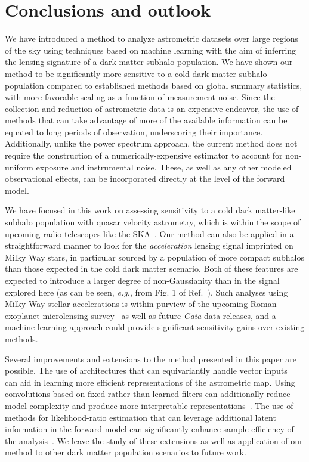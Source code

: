 \documentclass[preprint]{article}
\begin{document}
\section{Conclusions and outlook}
\label{sec:conclusions}

We have introduced a method to analyze astrometric datasets over large regions of the sky using techniques based on machine learning with the aim of inferring the lensing signature of a dark matter subhalo population. We have shown our method to be significantly more sensitive to a cold dark matter subhalo population compared to established methods based on global summary statistics, with more favorable scaling as a function of measurement noise. Since the collection and reduction of astrometric data is an expensive endeavor, the use of methods that can take advantage of more of the available information can be equated to long periods of observation, underscoring their importance. Additionally, unlike the power spectrum approach, the current method does not require the construction of a numerically-expensive estimator to account for non-uniform exposure and instrumental noise. These, as well as any other modeled observational effects, can be incorporated directly at the level of the forward model. 

We have focused in this work on assessing sensitivity to a cold dark matter-like subhalo population with quasar velocity astrometry, which is within the scope of upcoming radio telescopes like the SKA~\cite{Fomalont:2004hr,Jarvis:2015tqa}. Our method can also be applied in a straightforward manner to look for the \emph{acceleration} lensing signal imprinted on Milky Way stars, in particular sourced by a population of more compact subhalos than those expected in the cold dark matter scenario. Both of these features are expected to introduce a larger degree of non-Gaussianity than in the signal explored here (as can be seen, \emph{e.g.}, from Fig. 1 of Ref.~\cite{Mishra-Sharma:2020ynk}). Such analyses using Milky Way stellar accelerations is within purview of the upcoming Roman exoplanet microlensing survey~\cite{Pardo:2021uzy} as well as future \emph{Gaia} data releases, and a machine learning approach could provide significant sensitivity gains over existing methods.

Several improvements and extensions to the method presented in this paper are possible. The use of architectures that can equivariantly handle vector inputs~\cite{esteves2020spinweighted} can aid in learning more efficient representations of the astrometric map. Using convolutions based on fixed rather than learned filters can additionally reduce model complexity and produce more interpretable representations~\cite{Cheng:2020qbx,2021arXiv210709145H,2021arXiv210411244S,2021arXiv210202828M,Valogiannis:2021chp}. The use of methods for likelihood-ratio estimation that can leverage additional latent information in the forward model can significantly enhance sample efficiency of the analysis~\cite{Brehmer:2018eca,Brehmer:2018hga,Brehmer:2018kdj,Stoye:2018ovl}. We leave the study of these extensions as well as application of our method to other dark matter population scenarios to future work.
\end{document}
